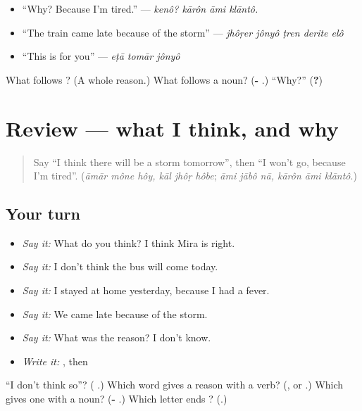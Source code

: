 \begin{itemize}
\raggedright
  \item \textquotedblleft{}Why? Because I'm tired.\textquotedblright{} — \emph{kenô? kārôn āmi klāntô.}
  \item \textquotedblleft{}The train came late because of the storm\textquotedblright{} — \emph{jhôṛer jônyô ṭren derite elô}
  \item \textquotedblleft{}This is for you\textquotedblright{} — \emph{eṭā tomār jônyô}
\end{itemize}

\begin{tcolorbox}[breakable,colback=teal!4,colframe=teal!35!black,title={Before you move on}]
What follows \textbf{}? (A whole reason.) What follows a noun? (\textbf{- }.) \textquotedblleft{}Why?\textquotedblright{} (\textbf{?})
\end{tcolorbox}
\section[(review)]{Review — what I think, and why}

\label{lesson:BN-R268-opinion-and-reason}



\begin{quote}
Say \textquotedblleft{}I think there will be a storm tomorrow\textquotedblright{}, then \textquotedblleft{}I won't go, because I'm tired\textquotedblright{}. (\emph{āmār mône hôy, kāl jhôṛ hôbe}; \emph{āmi jābô nā, kārôn āmi klāntô}.)
\end{quote}

\subsection*{Your turn}
\begin{itemize}
\raggedright
  \item \emph{Say it:} What do you think? I think Mira is right.
  \item \emph{Say it:} I don't think the bus will come today.
  \item \emph{Say it:} I stayed at home yesterday, because I had a fever.
  \item \emph{Say it:} We came late because of the storm.
  \item \emph{Say it:} What was the reason? I don't know.
  \item \emph{Write it:} \textbf{}, then \textbf{}
\end{itemize}

\begin{tcolorbox}[breakable,colback=teal!4,colframe=teal!35!black,title={Before you move on}]
\textquotedblleft{}I don't think so\textquotedblright{}? (\textbf{   }.) Which word gives a reason with a verb? (\textbf{}, or \textbf{}.) Which gives one with a noun? (\textbf{- }.) Which letter ends \textbf{}? (\textbf{}.)
\end{tcolorbox}

